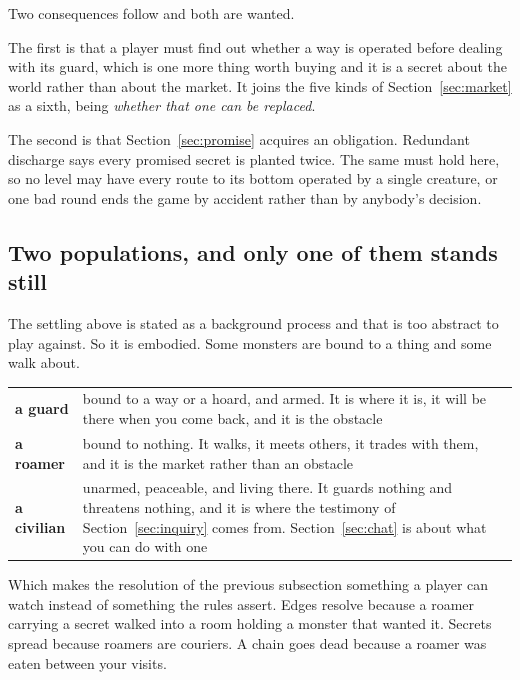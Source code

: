 \documentclass[11pt,a4paper]{article}
\begin{document}
Two consequences follow and both are wanted.

The first is that a player must find out whether a way is operated before dealing with its guard,
which is one more thing worth buying and it is a secret about the world rather than about the
market. It joins the five kinds of Section~\ref{sec:market} as a sixth, being \emph{whether that
one can be replaced}.

The second is that Section~\ref{sec:promise} acquires an obligation. Redundant discharge says every
promised secret is planted twice. The same must hold here, so no level may have every route to its
bottom operated by a single creature, or one bad round ends the game by accident rather than by
anybody's decision.

\subsection{Two populations, and only one of them stands still}
\label{sec:roamers}

The settling above is stated as a background process and that is too abstract to play against. So
it is embodied. Some monsters are bound to a thing and some walk about.

\begin{center}
\begin{tabular}{@{}l@{\hspace{4mm}}>{\raggedright\arraybackslash}p{}@{}}
\toprule
\textbf{a guard}    & bound to a way or a hoard, and armed. It is where it is, it will be there
when you come back, and it is the obstacle \\[1mm]
\textbf{a roamer}   & bound to nothing. It walks, it meets others, it trades with them, and it is
the market rather than an obstacle \\[1mm]
\textbf{a civilian} & unarmed, peaceable, and living there. It guards nothing and threatens nothing,
and it is where the testimony of Section~\ref{sec:inquiry} comes from. Section~\ref{sec:chat} is
about what you can do with one \\
\bottomrule
\end{tabular}
\end{center}

Which makes the resolution of the previous subsection something a player can watch instead of
something the rules assert. Edges resolve because a roamer carrying a secret walked into a room
holding a monster that wanted it. Secrets spread because roamers are couriers. A chain goes dead
because a roamer was eaten between your visits.
\end{document}
